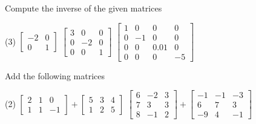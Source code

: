 \begin{exercise}
\pagebreak[2]
Compute the inverse of the given matrices
\begin{tasks}(3)
\task
$\begin{bmatrix}
-2 & 0 \\
0 & 1 
\end{bmatrix}$
\task
$\begin{bmatrix}
3 & 0 & 0 \\
0 & -2 & 0 \\ 
0 & 0 & 1
\end{bmatrix}$
\task
$\begin{bmatrix}
1 & 0 & 0 & 0 \\
0 & -1 & 0 & 0 \\ 
0 & 0 & 0.01 & 0 \\
0 & 0 & 0 & -5
\end{bmatrix}$
\end{tasks}
\end{exercise}

\setcounter{exercise}{100}

\begin{exercise}
Add the following matrices
\begin{tasks}(2)
\task
$\begin{bmatrix}
2 & 1 & 0 \\
1 & 1 & -1
\end{bmatrix}
+
\begin{bmatrix}
5 & 3 & 4 \\
1 & 2 & 5
\end{bmatrix}$
\task
$\begin{bmatrix}
6 & -2 & 3 \\
7 & 3 & 3 \\
8 & -1 & 2
\end{bmatrix}
+
\begin{bmatrix}
-1 & -1 & -3 \\
6 & 7 & 3 \\
-9 & 4 & -1
\end{bmatrix}$
\end{tasks}
\end{exercise}

